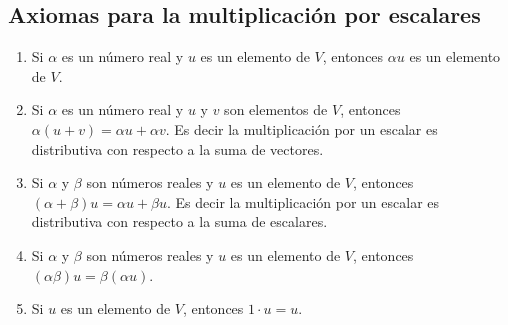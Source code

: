 \documentclass[10pt,a4paper]{amsbook}
\theoremstyle{definition}
\theoremstyle{remark}
\numberwithin{section}{chapter}
\numberwithin{equation}{chapter}
\begin{document}
\subsection*{Axiomas para la multiplicación por escalares}
\begin{enumerate}
\item Si $\alpha$ es un número real y $u$ es un elemento de $V$, entonces $\alpha u$ es un elemento de $V$.
\item Si $\alpha$ es un número real y $u$ y $v$ son elementos de $V$, entonces $\alpha (u+v) = \alpha u + \alpha v$. Es decir la multiplicación por un escalar es distributiva con respecto a la suma de vectores.
\item Si $\alpha$ y $\beta$ son números reales y $u$ es un elemento de $V$, entonces $(\alpha + \beta)u = \alpha u + \beta u$. Es decir la multiplicación por un escalar es distributiva con respecto a la suma de escalares.
\item Si $\alpha$ y $\beta$ son números reales y $u$ es un elemento de $V$, entonces $(\alpha \beta)u = \beta(\alpha u)$.
\item Si $u$ es un elemento de $V$, entonces $1 \cdot u = u$.
  
\end{enumerate}
\end{document}
